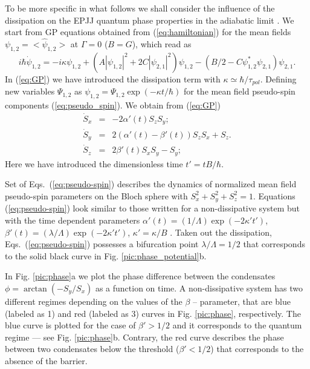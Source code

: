 \documentclass[aps, pre, preprint, groupedaddress, superscriptaddress, showkeys, showpacs] {revtex4-1}
\begin{document}
To be more specific in what follows we shall consider the influence of the dissipation on the EPJJ quantum phase properties in the adiabatic limit \cite{Sols}.
We start from GP equations obtained from  (\ref{eq:hamiltonian}) for the mean fields $\psi_{1,2}=<\hat\psi_{1,2}>$ at $\Gamma = 0$ ($B = G$), which read as
%
\begin{equation}
i \hbar \dot{\psi}_{1,2} = -i \kappa \psi_{1,2} + (A|\psi_{1,2}|^2 + 2C |\psi_{2,1}|^2) \psi_{1,2} - (B/2 - C \psi_{1,2}^* \psi_{2,1}) \psi_{2,1}. 
\label{eq:GP}
\end{equation}
%
In (\ref{eq:GP}) we have introduced the dissipation term with $\kappa \simeq \hbar/\tau_{pol}$.
Defining new variables $\Psi_{1,2}$ as $\psi_{1,2} = \Psi_{1,2} \exp(-\kappa t / \hbar)$ for the mean field pseudo-spin components (\ref{eq:pseudo_spin}).
We obtain from (\ref{eq:GP})
% 
\begin{equation}
\begin{array}{lcl}
\dot{S}_x & = & -2 \alpha'(t) S_z S_y; \\
\dot{S}_y & = & 2(\alpha'(t) - \beta'(t)) S_z S_x + S_z. \\
\dot{S}_z & = &  2 \beta'(t) S_x S_y - S_y;
\end{array}
\label{eq:pseudo-spin}
\end{equation}
%
Here we have introduced the dimensionless time $t' = t B / \hbar$.

Set of Eqs.\ ({\ref{eq:pseudo-spin}}) describes the dynamics of normalized mean field pseudo-spin parameters on the Bloch sphere with $S_x^2 + S_y^2 + S_z^2 = 1$.
Equations ({\ref{eq:pseudo-spin}}) look similar to those written for a non-dissipative system but with the time dependent parameters $\alpha'(t) = (1/ \Lambda) \exp(-2 \kappa' t')$, $\beta'(t) = (\lambda / \Lambda) \exp(-2 \kappa' t')$, $\kappa' = \kappa / B$ \cite{Sedov}.
Taken out the dissipation, Eqs.\ ({\ref{eq:pseudo-spin}}) possesses a bifurcation point $\lambda / \Lambda= 1 / 2$ that corresponds to the solid black curve in Fig. \ref{pic:phase_potential}b. 

In Fig. \ref{pic:phase}a we plot the phase difference between the condensates $ \phi = \arctan(-S_y / S_x)$ as a function on time.
A non-dissipative system has two different regimes depending on the values of the $\beta$ -- parameter, that are blue  (labeled as 1) and red (labeled as 3) curves in Fig. \ref{pic:phase}, respectively. The blue curve is plotted for the case of $\beta' > 1/2$ and it corresponds to the quantum regime --- see Fig. \ref{pic:phase}b. Contrary, the red curve describes the phase between two condensates below the threshold ($\beta' <1/2$) that corresponds to the absence of the barrier. 
\end{document}

